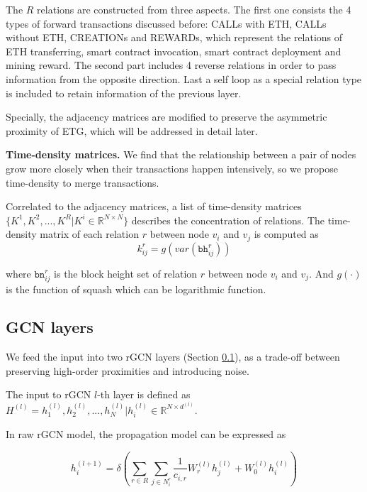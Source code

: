 The $R$ relations are constructed from three aspects. The first one consists the 4 types of forward transactions discussed before: CALLs with ETH, CALLs without ETH, CREATIONs and REWARDs, which represent the relations of ETH transferring, smart contract invocation, smart contract deployment and mining reward. The second part includes 4 reverse relations in order to pass information from the opposite direction. Last a self loop as a special relation type is included to retain information of the previous layer.

Specially, the adjacency matrices are modified to preserve the asymmetric proximity of ETG, which will be addressed in detail later. 




\textbf{Time-density matrices.} We find that the relationship between a pair of nodes grow more closely when their transactions happen intensively, so we propose time-density to merge transactions.

 Correlated to the adjacency matrices, a list of time-density matrices $\{K^1,K^2,...,K^R|K^i\in \mathbb{R}^{N \times N}\}$ describes the concentration of relations. The time-density matrix of each relation $r$ between node $v_i$ and $v_j$ is computed as%
\begin{equation}
k_{ij}^r=g(var(\texttt{bh}_{ij}^r))
\label{eq:time}
\end{equation}

where $\texttt{bn}_{ij}^{r}$ is the block height set of relation $r$ between node $v_i$ and $v_j$. And $g(\cdot)$ is the function of squash which can be logarithmic function.


\subsection{GCN layers}
\label{sec:rGCN layers}
 We feed the input into two rGCN layers (Section \ref{sec:rGCN layers}), as a trade-off between preserving high-order proximities and introducing noise.

The input to rGCN $l$-th layer is defined as $H^{(l)}={h_1^{(l)},h_2^{(l)},...,h_N^{(l)}|h_i^{(l)}\in \mathbb{R}^{N \times d^{(l)}}}$.

In raw rGCN model, the propagation model can be expressed as

\begin{equation}
h_i^{(l+1)}=\delta(\sum_{r\in R} \sum_{j \in N_i^r} \frac{1}{c_{i,r}}W_r^{(l)}h_j^{(l)}+W_0^{(l)}h_i^{(l)})
\label{eq:rgcn}
\end{equation}

